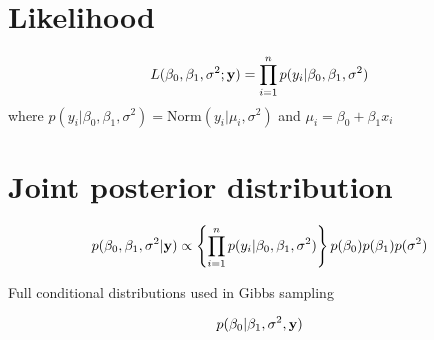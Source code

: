 \documentclass[12pt]{article}
\begin{document}
\section{Likelihood}

\[
  L(\beta_0,\beta_1,\sigma^2; {\bf y}) = \prod_{i=1}^n p(y_i|\beta_0,\beta_1,\sigma^2)
\]
where $p(y_i|\beta_0,\beta_1,\sigma^2) = \mathrm{Norm}(y_i|\mu_i,\sigma^2)$ and $\mu_i = \beta_0 + \beta_1x_i$


\section{Joint posterior distribution}


\[
  p(\beta_0,\beta_1,\sigma^2 | {\bf y}) \propto \left\{\prod_{i=1}^n p(y_i|\beta_0,\beta_1,\sigma^2)\right\}p(\beta_0)p(\beta_1)p(\sigma^2)
\]


Full conditional distributions used in Gibbs sampling


\[
  p(\beta_0|\beta_1,\sigma^2,{\bf y})
\]
\end{document}

